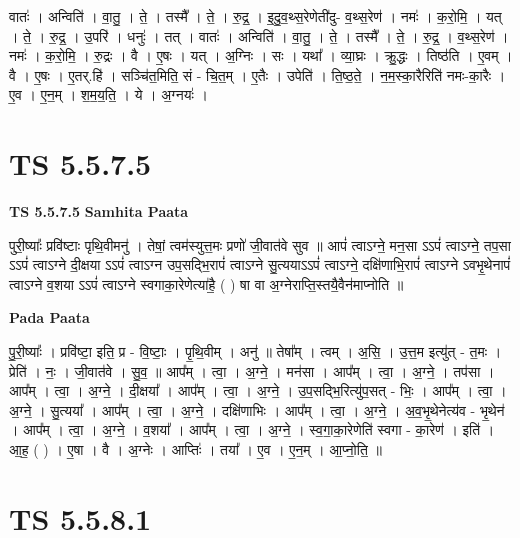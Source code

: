 \documentclass[17pt]{extarticle}
\begin{document}
वातः॑ । अन्विति॑ । वा॒तु॒ । ते॒ । तस्मै᳚ । ते॒ । रु॒द्र॒ । इ॒दु॒व॒थ्स॒रेणेती॑दु- व॒थ्स॒रेण॑ । नमः॑ । क॒रो॒मि॒ । यत् । ते॒ । रु॒द्र॒ । उ॒परि॑ । धनुः॑ । तत् । वातः॑ । अन्विति॑ । वा॒तु॒ । ते॒ । तस्मै᳚ । ते॒ । रु॒द्र॒ । व॒थ्स॒रेण॑ । नमः॑ । क॒रो॒मि॒ । रु॒द्रः । वै । ए॒षः । यत् । अ॒ग्निः । सः । यथा᳚ । व्या॒घ्रः । क्रु॒द्धः । तिष्ठ॑ति । ए॒वम् । वै । ए॒षः । ए॒तर्.हि॑ । सञ्चि॑त॒मिति॒ सं - चि॒त॒म् । ए॒तैः । उपेति॑ । ति॒ष्ठ॒ते॒ । न॒म॒स्का॒रैरिति॑ नमः-का॒रैः । ए॒व । ए॒न॒म् । श॒म॒य॒ति॒ । ये । अ॒ग्नयः॑ ।  \newline




\section*{ TS 5.5.7.5 }

\textbf{TS 5.5.7.5 } \newline
\textbf{Samhita Paata} \newline

पुरी॒ष्याः᳚ प्रवि॑ष्टाः पृथि॒वीमनु॑ । तेषां॒ त्वम॑स्युत्त॒मः प्रणो॑ जी॒वात॑वे सुव ॥ आपं॑ त्वाऽग्ने॒ मन॒सा ऽऽपं॑ त्वाऽग्ने॒ तप॒सा ऽऽपं॑ त्वाऽग्ने दी॒क्षया ऽऽपं॑ त्वाऽग्न उप॒सद्भि॒रापं॑ त्वाऽग्ने सु॒त्ययाऽऽपं॑ त्वाऽग्ने॒ दक्षि॑णाभि॒रापं॑ त्वाऽग्ने ऽवभृ॒थेनापं॑ त्वाऽग्ने व॒शया ऽऽपं॑ त्वाऽग्ने स्वगाका॒रेणेत्या॑है॒ ( ) षा वा अ॒ग्नेराप्ति॒स्तयै॒वैन॑माप्नोति ॥ \newline

\textbf{Pada Paata} \newline

पु॒री॒ष्याः᳚ । प्रवि॑ष्टा॒ इति॒ प्र - वि॒ष्टाः॒ । पृ॒थि॒वीम् । अनु॑ ॥ तेषा᳚म् । त्वम् । अ॒सि॒ । उ॒त्त॒म इत्यु॑त् - त॒मः । प्रेति॑ । नः॒ । जी॒वात॑वे । सु॒व॒ ॥ आप᳚म् । त्वा॒ । अ॒ग्ने॒ । मन॑सा । आप᳚म् । त्वा॒ । अ॒ग्ने॒ । तप॑सा । आप᳚म् । त्वा॒ । अ॒ग्ने॒ । दी॒क्षया᳚ । आप᳚म् । त्वा॒ । अ॒ग्ने॒ । उ॒प॒सद्भि॒रित्यु॑प॒सत् - भिः॒ । आप᳚म् । त्वा॒ । अ॒ग्ने॒ । सु॒त्यया᳚ । आप᳚म् । त्वा॒ । अ॒ग्ने॒ । दक्षि॑णाभिः । आप᳚म् । त्वा॒ । अ॒ग्ने॒ । अ॒व॒भृ॒थेनेत्य॑व - भृ॒थेन॑ । आप᳚म् । त्वा॒ । अ॒ग्ने॒ । व॒शया᳚ । आप᳚म् । त्वा॒ । अ॒ग्ने॒ । स्व॒गा॒का॒रेणेति॑ स्वगा - का॒रेण॑ । इति॑ । आ॒ह॒ ( ) । ए॒षा । वै । अ॒ग्नेः । आप्तिः॑ । तया᳚ । ए॒व । ए॒न॒म् । आ॒प्नो॒ति॒ ॥  \newline




\section*{ TS 5.5.8.1 }
\end{document}
